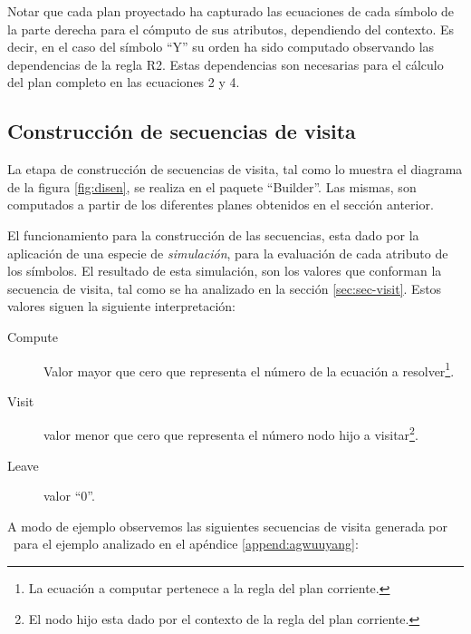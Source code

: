 Notar que cada plan proyectado ha capturado las ecuaciones de cada símbolo de la parte derecha para el cómputo de sus atributos, dependiendo del contexto. Es decir, en el caso del símbolo ``Y'' su orden ha sido computado observando las dependencias de la regla R2. Estas dependencias son necesarias para el cálculo del plan completo en las ecuaciones 2 y 4. 

\subsection*{Construcción de secuencias de visita}

La etapa de construcción de secuencias de visita, tal como lo muestra el diagrama de la figura \ref{fig:disen}, se realiza en el paquete ``Builder''. Las mismas, son computados a partir de los diferentes planes obtenidos en el sección anterior.

El funcionamiento para la construcción de las secuencias, esta dado por la aplicación de una especie de \textit{simulación}, para la evaluación de cada atributo de los símbolos. El resultado de esta simulación, son los valores que conforman la secuencia de visita, tal como se ha analizado en la sección \ref{sec:sec-visit}. Estos valores siguen la siguiente interpretación: 

\begin{description}
\item [Compute] Valor mayor que cero que representa el número de la ecuación a resolver\footnote{La ecuación a computar pertenece a la regla del plan corriente.}.
\item [Visit] valor menor que cero que representa el número nodo hijo a visitar\footnote{El nodo hijo esta dado por el contexto de la regla del plan corriente.}.
\item [Leave] valor ``0''.
\end{description}

A modo de ejemplo observemos las siguientes secuencias de visita generada por \maggen\ para el ejemplo analizado en el apéndice \ref{append:agwuuyang}:

